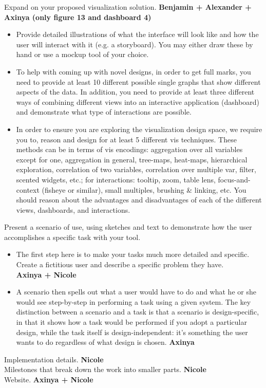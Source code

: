 \documentclass{article}
\begin{document}
 Expand on your proposed visualization solution. \textbf{Benjamin + Alexander + Axinya (only figure 13 and dashboard 4)}
\begin{itemize}
\item Provide detailed illustrations of what the interface will look like and how the user will interact with it (e.g. a storyboard). You may either draw these by hand or use a mockup tool of your choice.
\item To help with coming up with novel designs, in order to get full marks, you need to provide at least 10 different possible single graphs that show different aspects of the data. In addition, you need to provide at least three different ways of combining different views into an interactive application (dashboard) and demonstrate what type of interactions are possible.
\item In order to ensure you are exploring the visualization design space, we require you to, reason and design for at least 5 different vis techniques. These methods can be in terms of vis encodings: aggregation over all variables except for one, aggregation in general, tree-maps, heat-maps, hierarchical exploration, correlation of two variables, correlation over multiple var, filter, scented widgets, etc.; for interactions: tooltip, zoom, table lens, focus-and-context (fisheye or similar), small multiples, brushing & linking, etc.
You should reason about the advantages and disadvantages of each of the different views, dashboards, and interactions. 
\end{itemize}
Present a scenario of use, using sketches and text to demonstrate how the user accomplishes a specific task with your tool. 
\begin{itemize}
\item The first step here is to make your tasks much more detailed and specific. Create a fictitious user and describe a specific problem they have. \\ \textbf{Axinya + Nicole}
\item A scenario then spells out what a user would have to do and what he or she would see step-by-step in performing a task using a given system. The key distinction between a scenario and a task is that a scenario is design-specific, in that it shows how a task would be performed if you adopt a particular design, while the task itself is design-independent: it's something the user wants to do regardless of what design is chosen. \textbf{Axinya}
\end{itemize}
  Implementation details. \textbf{Nicole} \\
  Milestones that break down the work into smaller parts. \textbf{Nicole}\\
 Website. \textbf{Axinya + Nicole}
\end{document}
